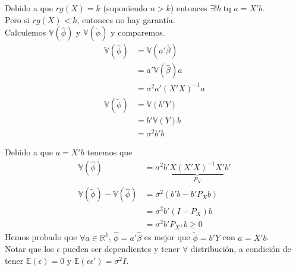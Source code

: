 \documentclass[10pt]{article}
\theoremstyle{plain}
\theoremstyle{definition}
\begin{document}
Debido a que $rg(X) = k$ (suponiendo $n>k$) entonces $\exists ! b$ tq $a=X'b$.\\

Pero si $rg(X) < k$, entonces no hay garantía.\\

Calculemos $\mathbb{V}(\hat{\phi})$ y $\mathbb{V}(\tilde{\phi})$ y comparemos.
\begin{align*}
\mathbb{V}(\hat{\phi}) &= \mathbb{V}(a'\hat{\beta})\\
&= a'\mathbb{V}(\hat{\beta})a\\
&= \sigma^2 a'(X'X)^{-1} a\\
\mathbb{V}(\tilde{\phi}) &= \mathbb{V}(b'Y)\\
&= b' \mathbb{V}(Y)b\\
&= \sigma^2 b'b
\end{align*}

Debido a que $a = X'b$ tenemos que 
\begin{align*}
\mathbb{V}(\hat{\phi}) &= \sigma^2 b'\underbrace{X(X'X)^{-1}X'}_{P_{X}}b'\\
\mathbb{V}(\tilde{\phi})- \mathbb{V}(\hat{\phi})&= \sigma^2 (b'b - b'P_{X}b)\\
&= \sigma^2b'(I-P_{X})b\\
&= \sigma^2 b'P_{X^{\perp}}b \ge 0
\end{align*}
Hemos probado que $\forall a \in \mathbb{R}^{k}$, $\hat{\phi}= a' \hat{\beta}$ es mejor que $\tilde{\phi}= b'Y$ con $a=X'b$.\\

Notar que los $\epsilon$ pueden ser dependientes y tener $\forall$ distribución, a condición de tener $\mathbb{E}(\epsilon)= 0$ y $\mathbb{E}(\epsilon\epsilon') = \sigma^2I$.
\end{document}
